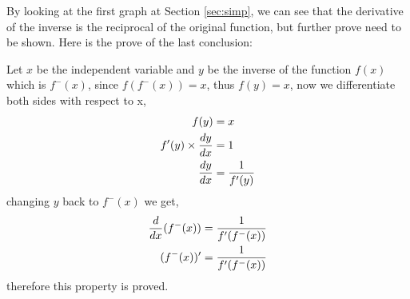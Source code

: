 \documentclass[12pt, titlepage]{article}
\begin{document}
    By looking at the first graph at Section \ref{sec:simp}, we can see that the derivative of the inverse is the reciprocal of the original function, but further prove need to be shown. Here is the prove of the last conclusion:
    
    Let $x$ be the independent variable and $y$ be the inverse of the function $f(x)$ which is $f^-(x)$, since $f(f^-(x))=x$, thus $f(y)=x$, now we differentiate both sides with respect to x,
    \begin{align}
        \centering
        f(y)&=x\\
        f'(y)\times\frac{dy}{dx}&=1\\
        \frac{dy}{dx}&=\frac{1}{f'(y)}
    \end{align}
    changing $y$ back to $f^-(x)$ we get,
    \begin{align}
        \centering
        \frac{d}{dx}(f^-(x))&=\frac{1}{f'(f^-(x))}\\
        (f^-(x))'&=\frac{1}{f'(f^-(x))}
    \end{align}
    therefore this property is proved.
\end{document}
